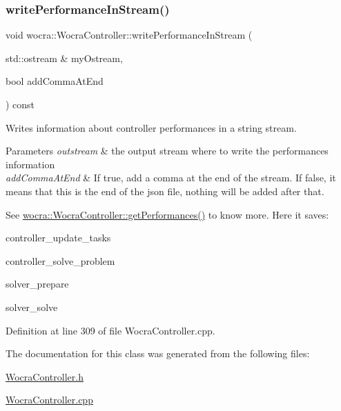 \subsubsection{\texorpdfstring{write\+Performance\+In\+Stream()}{writePerformanceInStream()}}
{\footnotesize\ttfamily void wocra\+::\+Wocra\+Controller\+::write\+Performance\+In\+Stream (\begin{DoxyParamCaption}\item[{std\+::ostream \&}]{my\+Ostream,  }\item[{bool}]{add\+Comma\+At\+End }\end{DoxyParamCaption}) const}

Writes information about controller performances in a string stream.


\begin{DoxyParams}{Parameters}
{\em outstream} & the output stream where to write the performances information \\
\hline
{\em add\+Comma\+At\+End} & If true, add a comma at the end of the stream. If false, it means that this is the end of the json file, nothing will be added after that.\\
\hline
\end{DoxyParams}
See \hyperlink{classwocra_1_1WocraController_a4023613cae33e5f490babbc6d162204d}{wocra\+::\+Wocra\+Controller\+::get\+Performances()} to know more. Here it saves\+:


\begin{DoxyItemize}
\item controller\+\_\+update\+\_\+tasks
\item controller\+\_\+solve\+\_\+problem
\item solver\+\_\+prepare
\item solver\+\_\+solve 
\end{DoxyItemize}

Definition at line 309 of file Wocra\+Controller.\+cpp.



The documentation for this class was generated from the following files\+:\begin{DoxyCompactItemize}
\item 
\hyperlink{WocraController_8h}{Wocra\+Controller.\+h}\item 
\hyperlink{WocraController_8cpp}{Wocra\+Controller.\+cpp}\end{DoxyCompactItemize}
